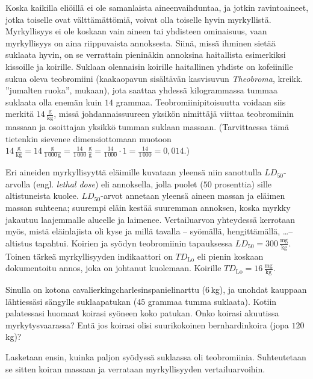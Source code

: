 %
%
%	

\begin{esimerkki}
Koska kaikilla eliöillä ei ole samanlaista aineenvaihduntaa, ja jotkin ravintoaineet, jotka toiselle ovat välttämättömiä, voivat olla toiselle hyvin myrkyllistä. Myrkyllisyys ei ole koskaan vain aineen tai yhdisteen ominaisuus, vaan myrkyllisyys on aina riippuvaista annoksesta. Siinä, missä ihminen sietää suklaata hyvin, on se verrattain pieninäkin annoksina haitallista esimerkiksi kissoille ja koirille. Suklaan olennaisin koirille haitallinen yhdiste on kofeiinille sukua oleva teobromiini (kaakaopavun sisältävän kasvisuvun \textit{Theobroma}, kreikk. ''jumalten ruoka'', mukaan), jota saattaa yhdessä kilogrammassa tummaa suklaata olla enemän kuin $14$ grammaa. Teobromiinipitoisuutta voidaan siis merkitä $14\,\frac{\text{g}}{\text{kg}}$, missä johdannaissuureen yksikön nimittäjä viittaa teobromiinin massaan ja osoittajan yksikkö tumman suklaan massaan. (Tarvittaessa tämä tietenkin sievenee dimensiottomaan muotoon $14\,\frac{\text{g}}{\text{kg}}=14\,\frac{\text{g}}{1\,000\,\text{g}}=\frac{14}{1\,000}\,\frac{\text{g}}{\text{g}}=\frac{14}{1\,000}\cdot 1=\frac{14}{1\,000}=0,014$.)

Eri aineiden myrkyllisyyttä eläimille kuvataan yleensä niin sanottulla $LD_{50}$-arvolla (engl. \textit{lethal dose}) eli annoksella, jolla puolet ($50$ prosenttia) sille altistuneista kuolee. $LD_{50}$-arvot annetaan yleensä aineen massan ja eläimen massan suhteena; suurempi eläin kestää suuremman annoksen, koska myrkky jakautuu laajemmalle alueelle ja laimenee. Vertailuarvon yhteydessä kerrotaan myös, mistä eläinlajista oli kyse ja millä tavalla -- syömällä, hengittämällä, \ldots -- altistus tapahtui. Koirien ja syödyn teobromiinin tapauksessa $LD_{50}=300\,\frac{\text{mg}}{\text{kg}}$. Toinen tärkeä myrkyllisyyden indikaattori on $T\!D_\text{Lo}$ eli pienin koskaan dokumentoitu annos, joka on johtanut kuolemaan. Koirille $T\!D_\text{Lo}=16\,\frac{\text{mg}}{\text{kg}}$.

Sinulla on kotona cavalierkingcharlesinspanielinarttu ($6$\,kg), ja unohdat kauppaan lähtiessäsi sängylle suklaapatukan ($45$ grammaa tumma suklaata). Kotiin palatessasi huomaat koirasi syöneen koko patukan. Onko koirasi akuutissa myrkytysvaarassa? Entä jos koirasi olisi suurikokoinen bernhardinkoira (jopa $120$\,kg)?
	\begin{esimratk}
	Lasketaan ensin, kuinka paljon syödyssä suklaassa oli teobromiinia. Suhteutetaan se sitten koiran massaan ja verrataan myrkyllisyyden vertailuarvoihin.
	

\end{esimratk}
\end{esimerkki}
